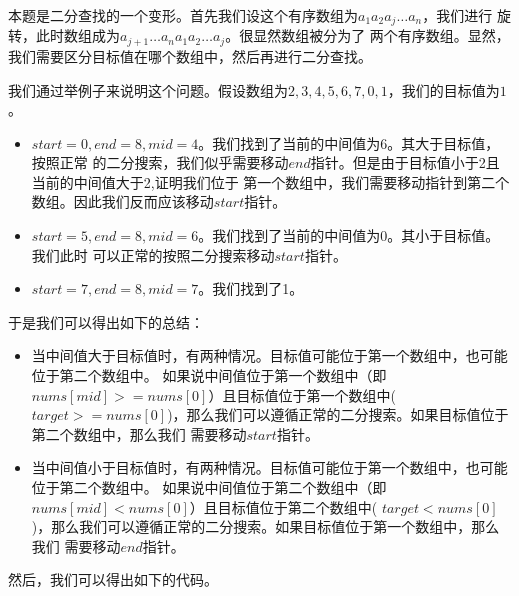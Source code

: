 \documentclass[../../main.tex]{subfiles}
\begin{document}
本题是二分查找的一个变形。首先我们设这个有序数组为$a_{1}a_{2}a_{j}\dots a_{n}$，我们进行
旋转，此时数组成为$a_{j + 1} \dots a_{n} a_{1}a_{2} \dots a_{j}$。很显然数组被分为了
两个有序数组。显然，我们需要区分目标值在哪个数组中，然后再进行二分查找。

我们通过举例子来说明这个问题。假设数组为$2,3,4,5,6,7,0,1$，我们的目标值为$1$。

\begin{itemize}
  \item $start = 0, end = 8, mid = 4$。我们找到了当前的中间值为6。其大于目标值，按照正常
  的二分搜索，我们似乎需要移动$end$指针。但是由于目标值小于2且当前的中间值大于2,证明我们位于
  第一个数组中，我们需要移动指针到第二个数组。因此我们反而应该移动$start$指针。
  \item $start = 5, end = 8, mid = 6$。我们找到了当前的中间值为0。其小于目标值。我们此时
  可以正常的按照二分搜索移动$start$指针。
  \item $start = 7, end = 8, mid = 7$。我们找到了1。
\end{itemize}

于是我们可以得出如下的总结：

\begin{itemize}
  \item 当中间值大于目标值时，有两种情况。目标值可能位于第一个数组中，也可能位于第二个数组中。
  如果说中间值位于第一个数组中（即$nums[mid] >= nums[0]$）且目标值位于第一个数组中(
  $target >= nums[0]$)，那么我们可以遵循正常的二分搜索。如果目标值位于第二个数组中，那么我们
  需要移动$start$指针。
  \item 当中间值小于目标值时，有两种情况。目标值可能位于第一个数组中，也可能位于第二个数组中。
  如果说中间值位于第二个数组中（即$nums[mid] < nums[0]$）且目标值位于第二个数组中(
  $target < nums[0]$)，那么我们可以遵循正常的二分搜索。如果目标值位于第一个数组中，那么我们
  需要移动$end$指针。
\end{itemize}

然后，我们可以得出如下的代码。


\end{document}
